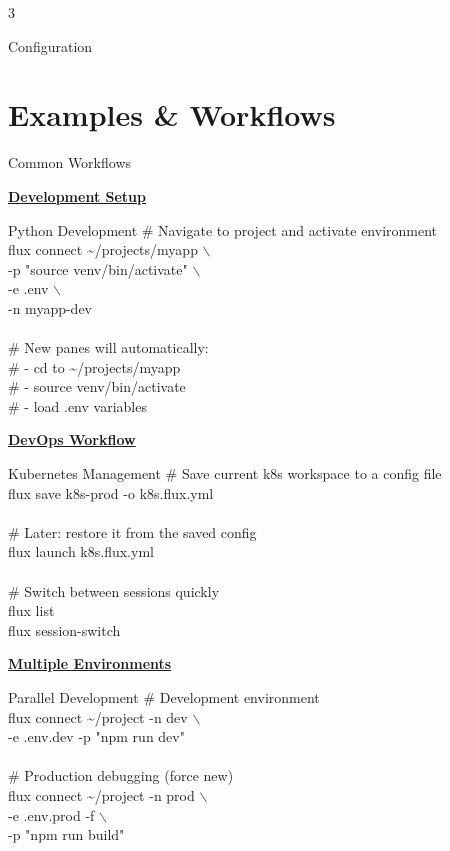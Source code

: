 \documentclass[10pt,a4paper]{article}
\begin{document}
\begin{multicols}{3}
\begin{textbox}{Configuration}
\end{textbox}

\vfill\null
\columnbreak

\section{Examples \& Workflows}

\begin{textbox}{Common Workflows}

\underline{\textbf{Development Setup}}

\begin{simplecodebox}{Python Development}
\# Navigate to project and activate environment\\
flux connect \textasciitilde/projects/myapp $\backslash$\\
\phantom{xx}-p "source venv/bin/activate" $\backslash$\\
\phantom{xx}-e .env $\backslash$\\
\phantom{xx}-n myapp-dev\\
\\
\# New panes will automatically:\\
\# - cd to \textasciitilde/projects/myapp\\
\# - source venv/bin/activate\\
\# - load .env variables\\
\end{simplecodebox}

\underline{\textbf{DevOps Workflow}}

\begin{simplecodebox}{Kubernetes Management}
\# Save current k8s workspace to a config file\\
flux save k8s-prod -o k8s.flux.yml\\
\\
\# Later: restore it from the saved config\\
flux launch k8s.flux.yml\\
\\
\# Switch between sessions quickly\\
flux list\\
flux session-switch\\
\end{simplecodebox}

\underline{\textbf{Multiple Environments}}

\begin{simplecodebox}{Parallel Development}
\# Development environment\\
flux connect \textasciitilde/project -n dev $\backslash$\\
\phantom{xx}-e .env.dev -p "npm run dev"\\
\\
\# Production debugging (force new)\\
flux connect \textasciitilde/project -n prod $\backslash$\\
\phantom{xx}-e .env.prod -f $\backslash$\\
\phantom{xx}-p "npm run build"\\
\end{simplecodebox}


\end{textbox}
\end{multicols}
\end{document}

